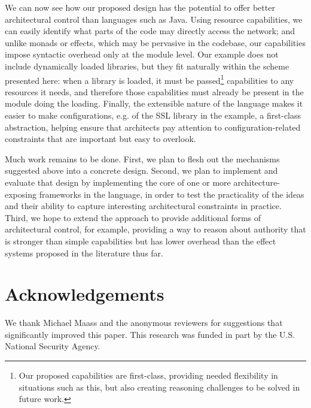 \documentclass[runningheads]{llncs}
\begin{document}
\begin{sloppypar}
We can now see how our proposed design has the potential to offer better architectural control than languages such as Java.  Using resource capabilities, we can easily identify what parts of the code may directly access the network; and unlike monads or effects, which may be pervasive in the codebase, our capabilities impose syntactic overhead only at the module level.  Our example does not include dynamically loaded libraries, but they fit naturally within the scheme presented here: when a library is loaded, it must be passed\footnote{Our proposed capabilities are first-class, providing needed flexibility in situations such as this, but also creating reasoning challenges to be solved in future work.} capabilities to any resources it needs, and therefore those capabilities must already be present in the module doing the loading.  Finally, the extensible nature of the language makes it easier to make configurations, e.g. of the SSL library in the example, a first-class abstraction, helping ensure that architects pay attention to configuration-related constraints that are important but easy to overlook.

Much work remains to be done.  First, we plan to flesh out the mechanisms suggested above into a concrete design.  Second, we plan to implement and evaluate that design by implementing the core of one or more architecture-exposing frameworks in the language, in order to test the practicality of the ideas and their ability to capture interesting architectural constraints in practice.  Third, we hope to extend the approach to provide additional forms of architectural control, for example, providing a way to reason about authority that is stronger than simple capabilities but has lower overhead than the effect systems proposed in the literature thus far.





\section*{Acknowledgements}

We thank Michael Maass and the anonymous reviewers for suggestions that significantly improved this paper.  This research was funded in part by the U.S. National Security Agency.




\end{sloppypar}
\end{document}
